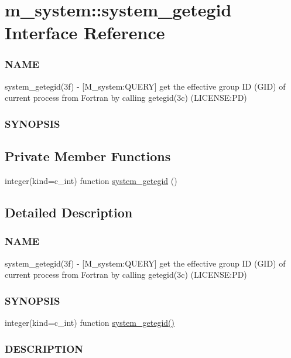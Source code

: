 \hypertarget{interfacem__system_1_1system__getegid}{}\section{m\+\_\+system\+:\+:system\+\_\+getegid Interface Reference}
\label{interfacem__system_1_1system__getegid}


\subsubsection*{N\+A\+ME}

system\+\_\+getegid(3f) -\/ \mbox{[}M\+\_\+system\+:Q\+U\+E\+RY\mbox{]} get the effective group ID (G\+ID) of current process from Fortran by calling getegid(3c) (L\+I\+C\+E\+N\+SE\+:PD) \subsubsection*{S\+Y\+N\+O\+P\+S\+IS} 


\subsection*{Private Member Functions}
\begin{DoxyCompactItemize}
\item 
integer(kind=c\+\_\+int) function \mbox{\hyperlink{interfacem__system_1_1system__getegid_a35fcd8b85449dac6703e97290f193ee4}{system\+\_\+getegid}} ()
\end{DoxyCompactItemize}


\subsection{Detailed Description}
\subsubsection*{N\+A\+ME}

system\+\_\+getegid(3f) -\/ \mbox{[}M\+\_\+system\+:Q\+U\+E\+RY\mbox{]} get the effective group ID (G\+ID) of current process from Fortran by calling getegid(3c) (L\+I\+C\+E\+N\+SE\+:PD) \subsubsection*{S\+Y\+N\+O\+P\+S\+IS}

integer(kind=c\+\_\+int) function \mbox{\hyperlink{interfacem__system_1_1system__getegid_a35fcd8b85449dac6703e97290f193ee4}{system\+\_\+getegid()}} \subsubsection*{D\+E\+S\+C\+R\+I\+P\+T\+I\+ON}

